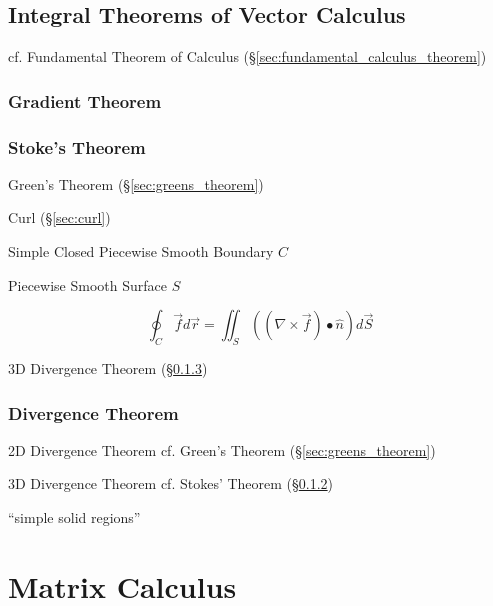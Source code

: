 \subsection{Integral Theorems of Vector Calculus}
\label{sec:integral_theorems}

cf. Fundamental Theorem of Calculus (\S\ref{sec:fundamental_calculus_theorem})



\subsubsection{Gradient Theorem}\label{sec:gradient_theorem}

\subsubsection{Stoke's Theorem}\label{sec:stokes_theorem}

\fist Green's Theorem (\S\ref{sec:greens_theorem})

Curl (\S\ref{sec:curl})

Simple Closed Piecewise Smooth Boundary $C$

Piecewise Smooth Surface $S$

\[
  \oint_C \vec{f} d\vec{r}
    = \iint_S ((\nabla \times \vec{f}) \bullet \hat{n}) d\vec{S}
\]

\fist 3D Divergence Theorem (\S\ref{sec:divergence_theorem})



\subsubsection{Divergence Theorem}\label{sec:divergence_theorem}

2D Divergence Theorem \fist cf. Green's Theorem (\S\ref{sec:greens_theorem})

3D Divergence Theorem \fist cf. Stokes' Theorem (\S\ref{sec:stokes_theorem})

``simple solid regions''



\section{Matrix Calculus}\label{sec:matrix_calculus}

